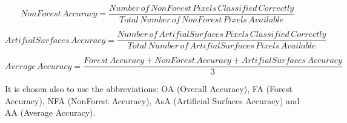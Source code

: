\begin{equation}
    NonForest\,Accuracy = \frac{Number\,of\,NonForest\,Pixels\,Classified\,Correctly}{Total\,Number\,of\,NonForest\,Pixels\, Available}
\end{equation}

\begin{equation}
    ArtifialSurfaces\,Accuracy = \frac{Number\,of\,ArtifialSurfaces\,Pixels\,Classified\,Correctly}{Total\,Number\,of\,ArtifialSurfaces\,Pixels\, Available}
\end{equation}

\begin{equation}
    Average\,Accuracy = \frac{Forest\,Accuracy+NonForest\,Accuracy+ArtifialSurfaces\,Accuracy}{3}
\end{equation}

It is chosen also to use the abbreviations: OA (Overall Accuracy), FA (Forest Accuracy), NFA (NonForest Accuracy), AsA (Artificial Surfaces Accuracy) and AA (Average Accuracy).